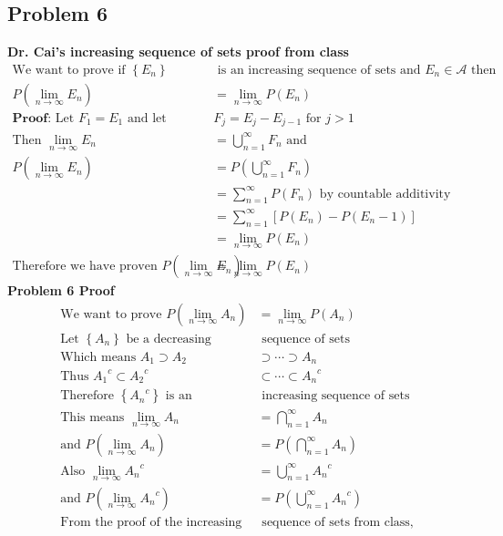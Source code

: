 \documentclass{article}
\begin{document}
\begin{flushleft}
\section*{Problem 6}
\textbf{Dr. Cai's increasing sequence of sets proof from class}
\begin{align*}
\text{We want to prove if } \left\{E_n\right\}& \text{ is an increasing sequence of sets and }E_n \in \mathcal{A} \text{ then}\\
P(\lim_{n\to \infty}E_n)&=\lim_{n\to \infty}P(E_n)\\
\textbf{Proof:} \text{ Let } F_1=E_1 \text{ and let } &F_j=E_j-E_{j-1} \text{ for } j>1\\
\text{Then } \lim_{n\to \infty} E_n&=\bigcup_{n=1}^{\infty}F_n \text{ and}\\
P(\lim_{n\to \infty} E_n)&=P\left(\bigcup_{n=1}^{\infty}F_n\right)\\
&=\sum \limits_{n=1}^{\infty}P(F_n) \text{ by countable additivity}\\
&=\sum \limits_{n=1}^{\infty}\left[P(E_n)-P(E_n-1) \right]\\
&=\lim_{n\to \infty}P(E_n)\\
\text{Therefore we have proven } P(\lim_{n\to \infty}E_n)&=\lim_{n\to \infty}P(E_n)
\end{align*}
\textbf{Problem 6 Proof}
\begin{align*}
\text{We want to prove } P\left(\lim_{n\to \infty}A_n \right)&=\lim_{n\to \infty}P(A_n)\\
\text{Let } \left\{A_n\right\} \text{ be a decreasing}& \text{ sequence of sets}\\
\text{Which means } A_1 \supset A_2 &\supset \cdots \supset A_n\\
\text{Thus } {A_1}^c \subset {A_2}^c &\subset \cdots \subset {A_n}^c\\
\text{Therefore } \left\{{A_n}^c\right\} \text{ is an} & \text{ increasing sequence of sets}\\
\text{This means } \lim_{n \to \infty} A_n&=\bigcap_{n=1}^{\infty}A_n\\
\text{and } P\left(\lim_{n \to \infty} A_n\right)&=P\left(\bigcap_{n=1}^{\infty}A_n\right) \label{1} \tag{1}\\
\text{Also } \lim_{n \to \infty} {A_n}^c &=\bigcup_{n=1}^{\infty}{A_n}^c\\
\text{and } P\left( \lim_{n \to \infty} {A_n}^c\right) &=P\left(\bigcup_{n=1}^{\infty}{A_n}^c\right) \label{2} \tag{2} \\
\text{From the proof of the increasing}&\text{ sequence of sets from class,}\\

\end{align*}
\end{flushleft}
\end{document}
